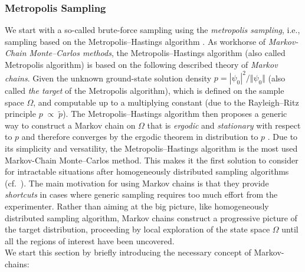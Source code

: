 \documentclass[11pt,a4paper]{article}
\numberwithin{equation}{section}
\begin{document}
\subsubsection{Metropolis Sampling}
%
%
We start with a so-called brute-force sampling using the \textit{metropolis sampling}, i.e., sampling based on the Metropolis--Hastings algorithm \cite{metropolis1953equation,hastings1970monte}.
%
As workhorse of {\it Markov-Chain Monte--Carlos methods}, the Metropolis--Hastings algorithm (also called Metropolis algorithm) is based on the following described theory of {\it Markov chains}.
%
Given the unknown ground-state solution density $p=|\psi_0|^2/\Vert\psi_0\Vert$ (also called {\it the target} of the Metropolis algorithm), which is defined on the sample space $\Omega$, and computable up to a multiplying constant (due to the Rayleigh--Ritz principle $p \;\propto \;\tilde{p}$).
%
The Metropolis--Hastings algorithm then proposes a generic way to construct a Markov chain on $\Omega$ that is {\it ergodic} and {\it stationary} with respect to $p$ and therefore converges by the ergodic theorem in distribution to $p$ \cite{norris1998markov,durrett2016essentials}.
%
Due to its simplicity and versatility, the Metropolis--Hastings algorithm is the most used Markov-Chain Monte--Carlos method.
%
This makes it the first solution to consider for intractable situations after homogeneously distributed sampling algorithms (cf.~\cite{robert2010introducing}). 
%
The main motivation for using Markov chains is that they provide {\it shortcuts} in cases where generic sampling requires too much effort from the experimenter.
%
Rather than aiming at the big picture, like homogeneously distributed sampling algorithm, Markov chains construct a progressive picture of the target distribution, proceeding by local exploration of the state space $\Omega$ until all the regions of interest have been uncovered. \\
We start this section by briefly introducing the necessary concept of Markov-chains:\\
\end{document}
